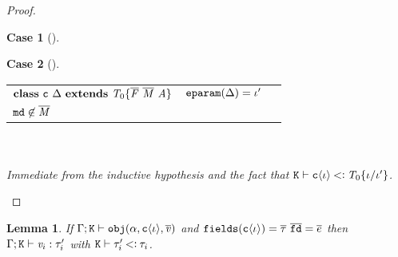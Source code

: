 \documentclass[onecolumn,nocopyrightspace]{sigplanconf}
\newtheorem{lemma}{Lemma}
\theoremstyle{lessintrusive}
\theoremstyle{plain}
\theoremstyle{custom}
\newtheorem*{case}{Case}
\theoremstyle{subcase-custom}
\begin{document}
\begin{proof}
\begin{case}[]
\end{case}

\begin{case}[] 
\begin{tabular}[t]{>{$}l<{$} >{$}l<{$} >{$}l<{$}}
\kwclass\ \Cname\ \tspec\ \kwextends\ \bt_0 \{ \fdlist \ \mdlist \ \attributor \} & \Feparam(\tspec) = \listi' & \\
\Mname \not\in \mdlist & & \\
\end{tabular}\\ \\
Immediate from the inductive hypothesis and the fact that $\cset\vdash\classiota\tsub\bt_0\subst{\listi'}{\listi}$.
\end{case} 

\end{proof}

\begin{lemma}
\label{pf:object-fields}
If $\Gamma;\mathtt{K}\vdash\mathtt{obj}(\alpha,\mathtt{c}\langle\iota\rangle,\overline{\mathit{v}})$ and $\Ffields(\classiota) = \overline{\t}\ \overline{\Fname} = \overline{e}$ then $\Gamma;\mathtt{K}\vdash\mathit{v}_i : \tau_i'$ with $\mathtt{K}\vdash\tau_i'\mathbin{<\vcentcolon}\tau_i$.
\end{lemma}
\end{document}
